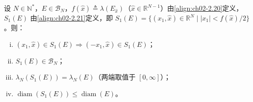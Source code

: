 \documentclass[../../main.tex]{subfiles}%
\begin{document}
\begin{lemma}\label{lemma:ch02-Steiner性质}
设 $N\in\mathbb N^*$，$E\in\mathscr B_N$，$f(\hat x)\triangleq\lambda(E_{\hat x})$（$\hat x\in\mathbb R^{N-1}$）由\eqref{align:ch02-2.20}定义，$S_1(E)$ 由\eqref{align:ch02-2.21}定义，即 $S_1(E)=\{(x_1,\hat x)\in\mathbb R^N\mid|x_1|<f(\hat x)/2\}$。则：
\begin{enumerate}[(i)]
\item $(x_1,\hat x)\in S_1(E)\Rightarrow(-x_1,\hat x)\in S_1(E)$；
\item $S_1(E)\in\mathscr B_N$；
\item $\lambda_N(S_1(E))=\lambda_N(E)$（两端取值于 $[0,\infty]$）；
\item $\operatorname{diam}(S_1(E))\leqslant\operatorname{diam}(E)$。
\end{enumerate}
\end{lemma}
\end{document}
